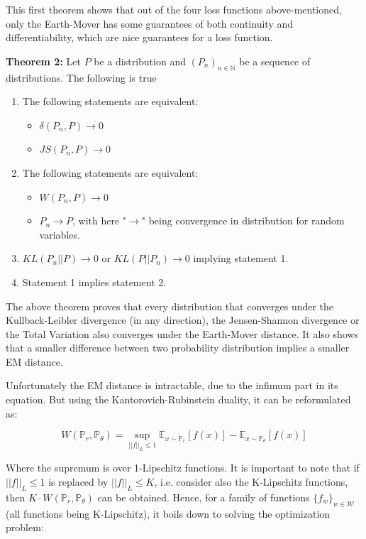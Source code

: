 \documentclass[11pt,a4paper,twoside]{report}
\begin{document}
This first theorem shows that out of the four loss functions above-mentioned, only the Earth-Mover has some guarantees of both continuity and differentiability, which are nice guarantees for a loss function.

\textbf{Theorem 2:} Let $P$ be a distribution and $(P_n)_{n \in \mathbb{N}}$ be a sequence of distributions. The following is true

\begin{enumerate}
    \item The following statements are equivalent:
    \begin{itemize}
        \item $\delta(P_n, P) \rightarrow 0$
        \item $JS(P_n, P) \rightarrow 0$
    \end{itemize}
    \item The following statements are equivalent:
    \begin{itemize}
        \item $W(P_n, P) \rightarrow 0$
        \item $P_n \rightarrow P$, with here "$\rightarrow$" being convergence in distribution for random variables. 
    \end{itemize}
    \item $KL(P_n||P) \rightarrow 0$ or $KL(P||P_n) \rightarrow 0$ implying statement 1.
    \item Statement 1 implies statement 2.
\end{enumerate}

The above theorem proves that every distribution that converges under the Kullback-Leibler divergence (in any direction), the Jensen-Shannon divergence or the Total Variation also converges under the Earth-Mover distance. It also shows that a smaller difference between two probability distribution implies a smaller EM distance. 

Unfortunately the EM distance is intractable, due to the infimum part in its equation. But using the Kantorovich-Rubinstein duality, it can be reformulated as:



\begin{equation}
    W(\mathbb{P}_r, \mathbb{P}_{\theta}) = \sup_{||f||_L \leq 1} \mathbb{E}_{x \sim \mathbb{P}_r} [f(x)] - \mathbb{E}_{x \sim \mathbb{P}_{\theta}} [f(x)] 
\end{equation}

Where the supremum is over 1-Lipschitz functions. It is important to note that if $||f||_L \leq 1$  is replaced by $||f||_L \leq K$, i.e. consider also the K-Lipschitz functions, then $K \cdot W(\mathbb{P}_r, \mathbb{P}_{\theta})$ can be obtained. Hence, for a family of functions $\{f_w\}_{w \in \mathcal{W}}$ (all functions being K-Lipschitz), it boils down to solving the optimization problem:
\end{document}
